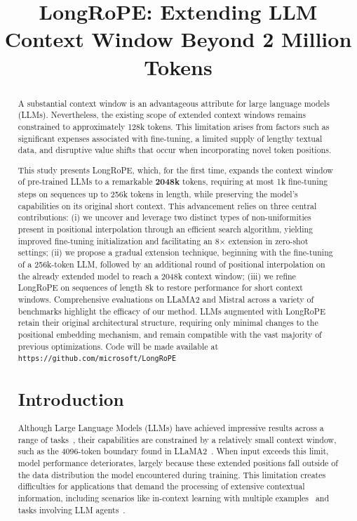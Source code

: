 \title{LongRoPE: Extending LLM Context Window Beyond 2 Million Tokens}

\begin{abstract}
A substantial context window is an advantageous attribute for large language models (LLMs). Nevertheless, the existing scope of extended context windows remains constrained to approximately 128k tokens. This limitation arises from factors such as significant expenses associated with fine-tuning, a limited supply of lengthy textual data, and disruptive value shifts that occur when incorporating novel token positions.

This study presents LongRoPE, which, for the first time, expands the context window of pre-trained LLMs to a remarkable \textbf{2048k} tokens, requiring at most 1k fine-tuning steps on sequences up to 256k tokens in length, while preserving the model's capabilities on its original short context. This advancement relies on three central contributions: (i) we uncover and leverage two distinct types of non-uniformities present in positional interpolation through an efficient search algorithm, yielding improved fine-tuning initialization and facilitating an 8$\times$ extension in zero-shot settings; (ii) we propose a gradual extension technique, beginning with the fine-tuning of a 256k-token LLM, followed by an additional round of positional interpolation on the already extended model to reach a 2048k context window; (iii) we refine LongRoPE on sequences of length 8k to restore performance for short context windows. Comprehensive evaluations on LLaMA2 and Mistral across a variety of benchmarks highlight the efficacy of our method. LLMs augmented with LongRoPE retain their original architectural structure, requiring only minimal changes to the positional embedding mechanism, and remain compatible with the vast majority of previous optimizations. Code will be made available at \texttt{https://github.com/microsoft/LongRoPE}

\section{Introduction}

Although Large Language Models (LLMs) have achieved impressive results across a range of tasks~\cite{gpt4,llama2}, their capabilities are constrained by a relatively small context window, such as the 4096-token boundary found in LLaMA2~\cite{llama2}. When input exceeds this limit, model performance deteriorates, largely because these extended positions fall outside of the data distribution the model encountered during training. This limitation creates difficulties for applications that demand the processing of extensive contextual information, including scenarios like in-context learning with multiple examples~\cite{Huang2023FewerIM} and tasks involving LLM agents~\cite{park2023generative,madaan2023selfrefine}.


\end{abstract}
